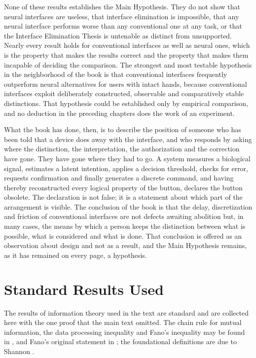 \documentclass[11pt,twoside,openany]{book}
\theoremstyle{definition}
\theoremstyle{remark}
\begin{document}
None of these results establishes the Main Hypothesis. They do not show that neural interfaces are useless, that interface elimination is impossible, that any neural interface performs worse than any conventional one at any task, or that the Interface Elimination Thesis is untenable as distinct from unsupported. Nearly every result holds for conventional interfaces as well as neural ones, which is the property that makes the results correct and the property that makes them incapable of deciding the comparison. The strongest and most testable hypothesis in the neighborhood of the book is that conventional interfaces frequently outperform neural alternatives for users with intact hands, because conventional interfaces exploit deliberately constructed, observable and comparatively stable distinctions. That hypothesis could be established only by empirical comparison, and no deduction in the preceding chapters does the work of an experiment.

What the book has done, then, is to describe the position of someone who has been told that a device does away with the interface, and who responds by asking where the distinction, the interpretation, the authorization and the correction have gone. They have gone where they had to go. A system measures a biological signal, estimates a latent intention, applies a decision threshold, checks for error, requests confirmation and finally generates a discrete command, and having thereby reconstructed every logical property of the button, declares the button obsolete. The declaration is not false; it is a statement about which part of the arrangement is visible. The conclusion of the book is that the delay, discretization and friction of conventional interfaces are not defects awaiting abolition but, in many cases, the means by which a person keeps the distinction between what is possible, what is considered and what is done. That conclusion is offered as an observation about design and not as a result, and the Main Hypothesis remains, as it has remained on every page, a hypothesis.

\appendix

\chapter{Standard Results Used}

The results of information theory used in the text are standard and are collected here with the one proof that the main text omitted. The chain rule for mutual information, the data processing inequality and Fano's inequality may be found in \cite{cover2006}, and Fano's original statement in \cite{fano1961}; the foundational definitions are due to Shannon \cite{shannon1948}.
\end{document}
